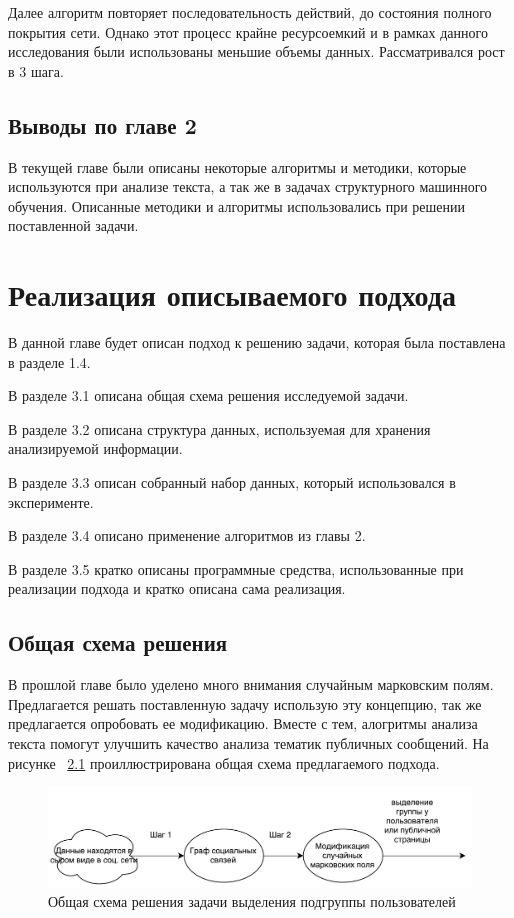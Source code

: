 \documentclass[annotation,times,page4]{itmo-student-thesis}
\begin{document}
Далее алгоритм повторяет последовательность действий, до состояния полного покрытия сети. Однако этот процесс крайне ресурсоемкий и в рамках данного исследования были использованы меньшие объемы данных. Рассматривался рост в 3 шага.
 
\section{Выводы по главе 2}
В текущей главе были описаны некоторые алгоритмы и методики, которые используются при анализе текста, а так же в задачах структурного машинного обучения. Описанные методики и алгоритмы использовались при решении поставленной задачи.
 
\chapter{Реализация описываемого подхода}
В данной главе будет описан подход к решению задачи, которая была поставлена в разделе 1.4.

В разделе 3.1 описана общая схема решения исследуемой задачи. 

В разделе 3.2 описана структура данных, используемая для хранения анализируемой информации. 

В разделе 3.3 описан собранный набор данных, который использовался в эксперименте.

В разделе 3.4 описано применение алгоритмов из главы 2.

В разделе 3.5 кратко описаны программные средства, использованные при реализации подхода и кратко описана сама реализация.

\section{Общая схема решения}
В прошлой главе было уделено много внимания случайным марковским полям. Предлагается решать поставленную задачу использую эту концепцию, так же предлагается опробовать ее модификацию. Вместе с тем, алогритмы анализа текста помогут улучшить качество анализа тематик публичных сообщений. На рисунке ~\ref{fig:plan} проиллюстрирована общая схема предлагаемого подхода.

\begin{figure}[!h]
\caption{Общая схема решения задачи выделения подгруппы пользователей}
\label{fig:plan}
\centering
\includegraphics[width=\textwidth]{figs/plan.pdf}
\end{figure}
\end{document}
